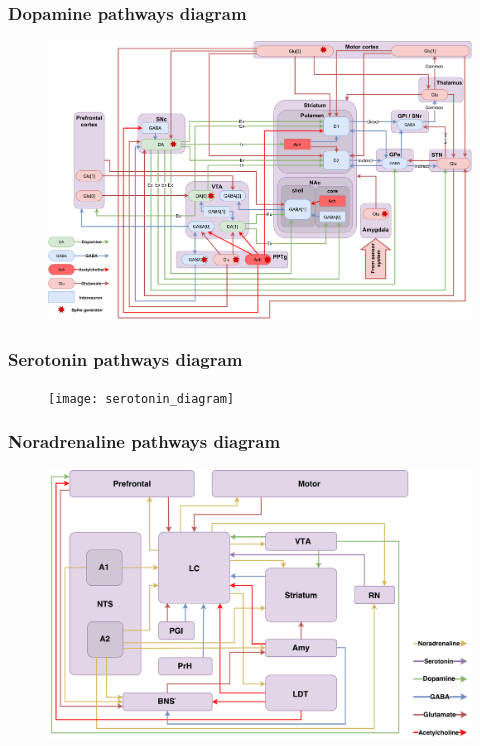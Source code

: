 \documentclass[12pt, aspectratio=169]{beamer}
\begin{document}

\begin{frame}
\frametitle{Dopamine pathways diagram}
\begin{figure}
\includegraphics[width=0.8\linewidth]{dopamine_diagram}
\end{figure}
\end{frame}


\begin{frame}
\frametitle{Serotonin pathways diagram}
\begin{figure}
\texttt{[image: serotonin\_diagram]}
\end{figure}
\end{frame}


\begin{frame}
\frametitle{Noradrenaline pathways diagram}
\begin{figure}
\includegraphics[width=0.8\linewidth]{NA_diagram}
\end{figure}
\end{frame}
\end{document}
